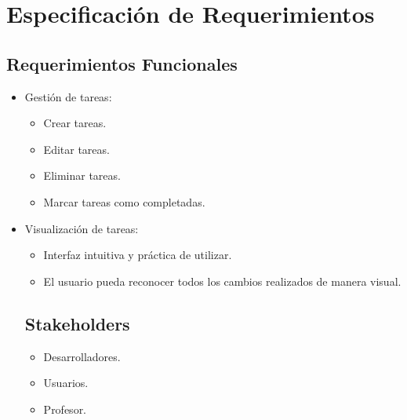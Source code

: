 \chapter{Especificación de Requerimientos}
\section{Requerimientos Funcionales}
\begin{itemize}
  \item Gestión de tareas:
    \begin{itemize}
      \item Crear tareas.
      \item Editar tareas.
      \item Eliminar tareas.
      \item Marcar tareas como completadas.
    \end{itemize}
  \item Visualización de tareas:
    \begin{itemize}
      \item Interfaz intuitiva y práctica de utilizar.
      \item El usuario pueda reconocer todos los cambios realizados de manera visual.
    \end{itemize}
    \section{Stakeholders}
    \begin{itemize}
        \item Desarrolladores.
        \item Usuarios.
        \item Profesor.
    \end{itemize}
\end{itemize}
